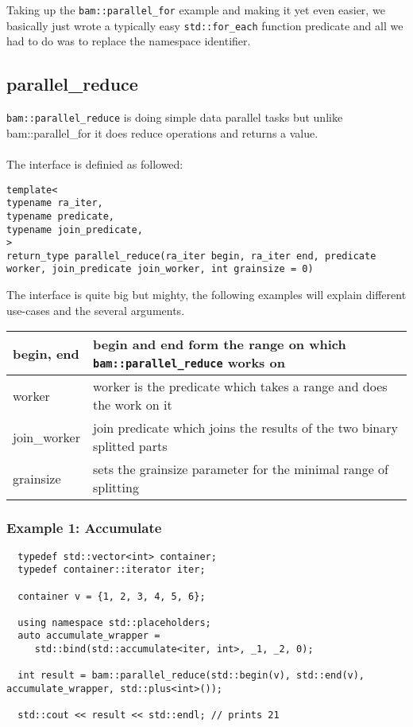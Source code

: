 \documentclass[11pt, a4paper]{article}
\begin{document}
Taking up the \texttt{bam::parallel\_for} example and making it yet even easier, we basically just wrote a typically easy \texttt{std::for\_each} function predicate and all we had to do was to replace the namespace identifier. 

\subsection{parallel\_reduce}
\texttt{bam::parallel\_reduce} is doing simple data parallel tasks but unlike bam::parallel\_for it does reduce operations and returns a value.
\\\\The interface is definied as followed:
\begin{lstlisting}
template<
typename ra_iter, 
typename predicate, 
typename join_predicate, 
>
return_type parallel_reduce(ra_iter begin, ra_iter end, predicate worker, join_predicate join_worker, int grainsize = 0)

\end{lstlisting}

The interface is quite big but mighty, the following examples will explain different use-cases and the several arguments.

\begin{center}
  \begin{tabular}{ | l |  p{10cm} | }
    \hline
	begin,  end & begin and end form the range on which \texttt{bam::parallel\_reduce} works on \\ \hline
	worker & worker is the predicate which takes a range and does the work on it \\  \hline
	join\_worker & join predicate which joins the results of the two binary splitted parts \\ \hline
	grainsize & sets the grainsize parameter for the minimal range of splitting \\ \hline
  \end{tabular}
\end{center}

\subsubsection{Example 1: Accumulate}

\begin{lstlisting}
  typedef std::vector<int> container;
  typedef container::iterator iter;

  container v = {1, 2, 3, 4, 5, 6};

  using namespace std::placeholders;
  auto accumulate_wrapper = 
     std::bind(std::accumulate<iter, int>, _1, _2, 0);

  int result = bam::parallel_reduce(std::begin(v), std::end(v), accumulate_wrapper, std::plus<int>());

  std::cout << result << std::endl; // prints 21
\end{lstlisting}
\end{document}
